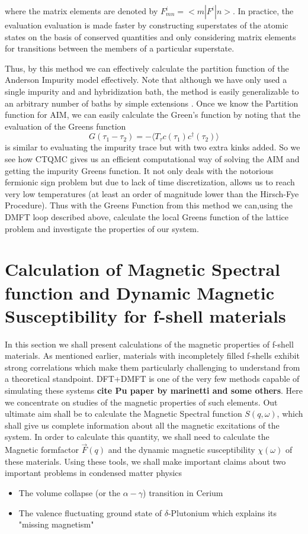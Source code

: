 \documentclass[10pt]{ruthesis}
\begin{document}
{where the matrix elements are denoted by $F^{i}_{mn}=<m|F^{i}|n>$. In practice, the evaluation evaluation is made faster by constructing superstates of the atomic states on the basis of conserved quantities and only considering matrix elements for transitions between the members of a particular  superstate.

Thus, by this method we can effectively calculate the partition function of the Anderson Impurity model effectively. Note that although we have only used a single impurity and and hybridization bath, the method is easily generalizable to an arbitrary number of baths by simple extensions \cite{hauleqmc}. Once we know the Partition function for AIM, we can easily calculate the Green's function by noting that the evaluation of the Greens function
\begin{equation}
G(\tau_{1}-\tau_{2})=-\langle T_{\tau} c(\tau_{1})c^{\dagger}(\tau_{2})\rangle
\end{equation}
 is similar to evaluating the impurity trace but with two extra kinks added. 
So we see how CTQMC gives us an efficient computational way of solving the AIM and getting the impurity Greens function. It not only deals with the notorious fermionic sign problem but due to lack of time discretization, allows us to reach very low temperatures (at least an order of magnitude lower than the Hirsch-Fye Procedure). Thus with the Greens Function from this method we can,using the DMFT loop described above, calculate the local Greens function of the lattice problem and investigate the properties of our system.

\pagebreak
\chapter{Calculation of Magnetic Spectral function and Dynamic Magnetic Susceptibility for f-shell materials}

In this section we shall present calculations of the magnetic properties of f-shell materials. As mentioned earlier, materials with incompletely filled f-shells exhibit strong correlations which make them particularly challenging to understand from a theoretical standpoint. DFT+DMFT is one of the very few methods capable of simulating these systems \textbf{cite Pu paper by marinetti and some others}. Here we concentrate on studies of the magnetic properties of such elements. Out ultimate aim shall be to calculate the Magnetic Spectral function $S(q,\omega)$, which shall give us complete information about all the magnetic excitations of the system. In order to calculate this quantity, we shall need to calculate the Magnetic formfactor $\vec{F}(q)$ and the dynamic magnetic susceptibility $\chi(\omega)$ of these materials. Using these tools, we shall make important claims about two important problems in condensed matter physics
\begin{itemize}
\item The volume collapse (or the $\alpha - \gamma$) transition in Cerium
\item The valence fluctuating ground state of $\delta$-Plutonium which explains its "missing magnetism" 
\end{itemize}

}
\end{document}
